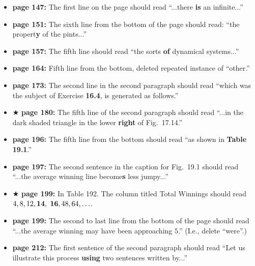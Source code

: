 \documentclass[12pt]{article}
\begin{document}
\begin{itemize}
  \item {\bf page 147:} The first line on the page should read
    ``...there {\bf is} an infinite...''

  \item {\bf page 151:} The sixth line from the bottom of the page
    should read: ``the propert{\bf y} of the pints...''

  \item {\bf page 157:}  The fifth line should read ``the sorts {\bf
    of} dynamical systems...'' 

  \item {\bf page 164:}  Fifth line from the bottom, deleted repeated
    instance of ``other.'' %

  \item {\bf page 173:}  The second line in the second paragraph
    should read ``which was the subject of Exercise {\bf 16.4}, is
    generated as follows.''  %

  \item $\bigstar$ {\bf page 180:}  The fifth line of the second
  paragraph should read ``...in the dark shaded triangle in the lower
  {\bf right} of Fig.~17.14.'' 

  \item {\bf page 196:}  The fifth line from the bottom should read
    ``as shown in {\bf Table 19.1}.''  

  \item {\bf page 197:}  The second sentence in the caption for
    Fig.~19.1 should read ``...the average winning line become{\bf s}
    less jumpy...'' %

  \item $\bigstar$ {\bf page 199:}  In Table 192.  The column titled
    Total Winnings should read $4, 8, 12, {\bf 14},$ $ {\bf 16}, 48, 64,
    \ldots$.  

  \item {\bf page 199:}  The second to last line from the bottom of
    the page should read ``...the average winning may have been
    approaching $5$.''  (I.e., delete ``were''.)  %

  \item {\bf page 212:} The first sentence of the second paragraph
    should read ``Let us illustrate this process {\bf using} two
    sentences written by...'' %


\end{itemize}
\end{document}
